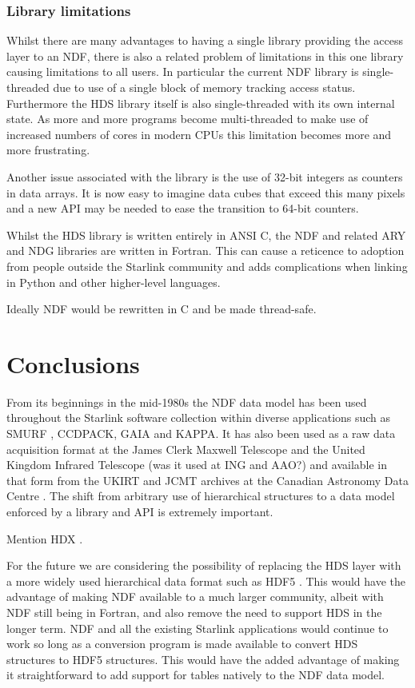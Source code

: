 \documentclass[final,authoryear,5p,times,twocolumn]{elsarticle}
\begin{document}
{\subsubsection{Library limitations}

Whilst there are many advantages to having a single library
providing the access layer to an NDF, there is also a related problem
of limitations in this one library causing limitations to all
users. In particular the current NDF library is single-threaded due to
use of a single block of memory tracking access status. Furthermore
the HDS library itself is also single-threaded with its own internal
state. As more and more programs become multi-threaded to make use of
increased numbers of cores in modern CPUs this limitation becomes more
and more frustrating.

Another issue associated with the library is the use of 32-bit
integers as counters in data arrays. It is now easy to imagine data
cubes that exceed this many pixels and a new API may be needed to ease
the transition to 64-bit counters.

Whilst the HDS library is written entirely in ANSI C, the NDF and
related ARY \citep{SUN11} and NDG \citep{SUN2} libraries are written in Fortran.
This can cause a reticence to adoption from people outside the Starlink community and
adds complications when linking in Python and other higher-level
languages.

Ideally NDF would be rewritten in C and be made thread-safe.

\section{Conclusions}

From its beginnings in the mid-1980s the NDF data model has been used
throughout the Starlink software collection within diverse
applications such as SMURF \citep{2013MNRAS.430.2545C}, CCDPACK, GAIA
and KAPPA. It has also been used as a raw data acquisition format at the
James Clerk Maxwell Telescope and the United Kingdom Infrared
Telescope {\color{red} (was it used at ING and AAO?)} and available in that form
from the UKIRT and JCMT archives at the Canadian Astronomy Data Centre
\citep{2008ASPC..394..450E,P01_adassxxiii}. The shift from arbitrary
use of hierarchical structures to a data model enforced by a library
and API is extremely important.

{\color{red} Mention HDX \citep{2003ASPC..295..221G}.}

For the future we are considering the possibility of replacing the HDS
layer with a more widely used hierarchical data format such as HDF5
\citep{Folk:2011:OHT:1966895.1966900}. This would have the advantage
of making NDF available to a much larger community, albeit with NDF
still being in Fortran, and also remove the
need to support HDS in the longer term. NDF and all the existing
Starlink applications would continue to work so long as a conversion
program is made available to convert HDS structures to HDF5 structures.
This would have the added advantage of making it straightforward to
add support for tables natively to the NDF data model.

}
\end{document}
